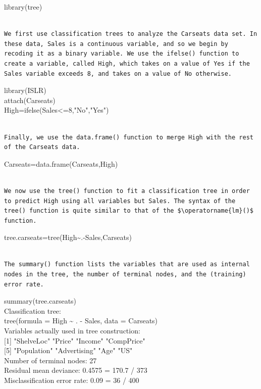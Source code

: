 \documentclass[10pt]{article}
\begin{document}
\begin{displayquote}
library(tree)
\end{displayquote}

\begin{verbatim}

We first use classification trees to analyze the Carseats data set. In these data, Sales is a continuous variable, and so we begin by recoding it as a binary variable. We use the ifelse() function to create a variable, called High, which takes on a value of Yes if the Sales variable exceeds 8, and takes on a value of No otherwise.
\end{verbatim}

\begin{displayquote}
library(ISLR)\\
attach(Carseats)\\
High=ifelse(Sales<=8,"No","Yes")
\end{displayquote}

\begin{verbatim}

Finally, we use the data.frame() function to merge High with the rest of the Carseats data.
\end{verbatim}

\begin{displayquote}
Carseats=data.frame(Carseats,High)
\end{displayquote}

\begin{verbatim}

We now use the tree() function to fit a classification tree in order to predict High using all variables but Sales. The syntax of the tree() function is quite similar to that of the $\operatorname{lm}()$ function.
\end{verbatim}

\begin{displayquote}
tree.carseats=tree(High\~{}.-Sales,Carseats)
\end{displayquote}

\begin{verbatim}

The summary() function lists the variables that are used as internal nodes in the tree, the number of terminal nodes, and the (training) error rate.
\end{verbatim}

\begin{displayquote}
summary(tree.carseats)\\
Classification tree:\\
tree(formula = High \~{} . - Sales, data = Carseats)\\
Variables actually used in tree construction:\\[0pt]
[1] "ShelveLoc" "Price" "Income" "CompPrice"\\[0pt]
[5] "Population" "Advertising" "Age" "US"\\
Number of terminal nodes: 27\\
Residual mean deviance: 0.4575 = 170.7 / 373\\
Misclassification error rate: 0.09 = 36 / 400
\end{displayquote}
\end{document}
